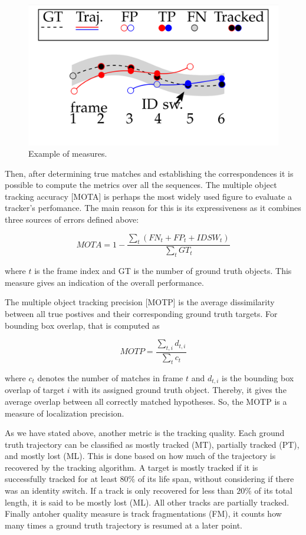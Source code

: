 \begin{figure}[H]
\centering         
\includegraphics[width=0.7\linewidth]{datasetTracking/trackins.png}
\caption{Example of measures.} \label{petsExample}
\end{figure}

Then, after determining true matches and establishing the correspondences it is possible to compute the metrics over all the sequences. The multiple object tracking accuracy [MOTA] \cite{clear} is perhaps the most widely used figure to evaluate a tracker's perfomance. The main reason for this is its expressiveness as it combines three sources of errors defined above:

$$ MOTA = 1 - \frac{\sum_{t} (FN_{t}+FP_{t}+IDSW_{t})}{ \sum_{t} GT_{t}}$$

where $t$ is the frame index and GT is the number of ground truth objects. This measure gives an indication of the overall performance.

The multiple object tracking precision [MOTP] is the average dissimilarity between all true postives and their corresponding ground truth targets. For bounding box overlap, that is computed as 

$$ MOTP =  \frac{\sum _{t,i} d_{t,i}}{ \sum_{t} c_{t}} $$

where $c_{t}$ denotes the number of matches in frame $t$ and $d_{t,i}$ is the bounding box overlap of target $i$ with its assigned ground truth object. Thereby, it gives the average overlap between all correctly matched hypotheses. So, the MOTP is a measure of localization precision.


As we have stated above, another metric is the tracking quality. Each ground truth trajectory can be classified as mostly tracked (MT), partially tracked (PT), and mostly lost (ML). This is done based on how much of the trajectory is recovered by the tracking algorithm. A target is mostly tracked if it is successfully tracked for at least $80 \%$ of its life span, without considering if there was an identity switch. If a track is only recovered for less than $20 \%$ of its total length, it is said to be mostly lost (ML). All other tracks are partially tracked. Finally antoher quality measure is track fragmentations (FM), it counts how many times a ground truth trajectory is resumed at a later point.


